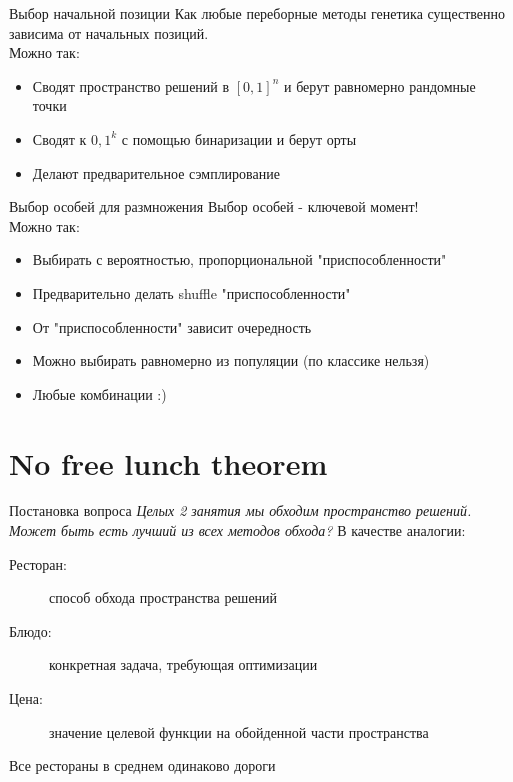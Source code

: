\documentclass[14pt, fleqn, xcolor={dvipsnames, table}]{beamer}
\begin{document}
\begin{frame}{Выбор начальной позиции}
Как любые переборные методы генетика существенно зависима от начальных позиций. \\
Можно так:
\begin{itemize}
  \item Сводят пространство решений в $[0,1]^n$ и берут равномерно рандомные точки
  \item Сводят к ${0,1}^k$ с помощью бинаризации и берут орты
  \item Делают предварительное сэмплирование
\end{itemize}
\end{frame}

\begin{frame}{Выбор особей для размножения}
Выбор особей - ключевой момент! \\
Можно так:
\begin{itemize}
  \item Выбирать с вероятностью, пропорциональной "приспособленности"
  \item Предварительно делать shuffle "приспособленности"
  \item От "приспособленности" зависит очередность
  \item Можно выбирать равномерно из популяции (по классике нельзя)
  \item Любые комбинации :)
\end{itemize}
\end{frame}

\section{No free lunch theorem}
\begin{frame}{Постановка вопроса}
\textit{Целых 2 занятия мы обходим пространство решений. Может быть есть лучший из всех методов обхода?}
В качестве аналогии:
\begin{description}
  \item[Ресторан:] способ обхода пространства решений
  \item[Блюдо:] конкретная задача, требующая оптимизации
  \item[Цена:] значение целевой функции на обойденной части пространства
\end{description}
\begin{theorem}
Все рестораны в среднем одинаково дороги
\end{theorem}
\end{frame}
\end{document}
